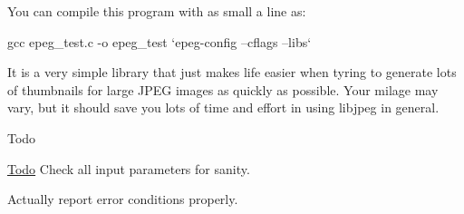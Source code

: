You can compile this program with as small a line as\+:

\begin{DoxyVerb}gcc epeg_test.c -o epeg_test `epeg-config --cflags --libs`
\end{DoxyVerb}


It is a very simple library that just makes life easier when tyring to generate lots of thumbnails for large J\+P\+E\+G images as quickly as possible. Your milage may vary, but it should save you lots of time and effort in using libjpeg in general.

\begin{DoxyRefDesc}{Todo}
\item[\hyperlink{todo__todo000001}{Todo}]Check all input parameters for sanity. 

Actually report error conditions properly.\end{DoxyRefDesc}
